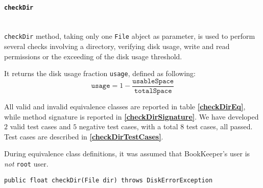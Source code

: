 \documentclass[sigconf]{acmart}
\begin{document}
\paragraph{\texttt{checkDir}}
\hfill\\
\texttt{checkDir} method, taking only one \texttt{File} abject as parameter, is used to perform several checks involving a directory, verifying disk usage, write and read permissions or the exceeding of the disk usage threshold. 

It returns the disk usage fraction \texttt{usage}, defined as following: 
\begin{equation}
\label{eqn:checkDirUsage}
\texttt{usage} = 1 - \dfrac{\texttt{usableSpace}}{\texttt{totalSpace}}
\end{equation}

All valid and invalid equivalence classes are reported in table \textbf{\cref{checkDirEq}}, while method signature is reported in \textbf{\cref{checkDirSignature}}. We have developed $2$ valid test cases and $5$ negative test cases, with a total $8$ test cases, all passed. Test cases are described in \textbf{\cref{checkDirTestCases}}.

During equivalence class definitions, it was assumed that BookKeeper's user is \textit{not} \texttt{root} user.

\begin{lstlisting}[frame=lines,basicstyle=\ttfamily\tiny, caption={Signature of method \texttt{checkDir}}, label={checkDirSignature}]
public float checkDir(File dir) throws DiskErrorException
\end{lstlisting}
\end{document}
